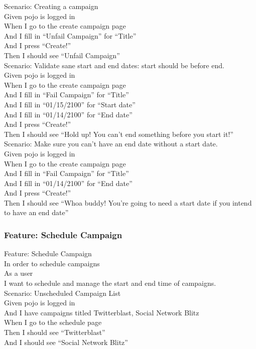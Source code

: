 \documentclass[12pt]{article}
\begin{document}
Scenario: Creating a campaign \\
  Given pojo is logged in \\
  When I go to the create campaign page \\
  And I fill in ``Unfail Campaign'' for ``Title'' \\
  And I press ``Create!'' \\
  Then I should see ``Unfail Campaign'' \\

Scenario: Validate sane start and end dates: start should be before end. \\
  Given pojo is logged in \\
  When I go to the create campaign page \\
  And I fill in ``Fail Campaign'' for ``Title'' \\
  And I fill in ``01/15/2100'' for ``Start date'' \\
  And I fill in ``01/14/2100'' for ``End date'' \\
  And I press ``Create!'' \\
  Then I should see ``Hold up! You can't end something before you start it!'' \\

Scenario: Make sure you can't have an end date without a start date. \\
  Given pojo is logged in \\
  When I go to the create campaign page \\
  And I fill in ``Fail Campaign'' for ``Title'' \\
  And I fill in ``01/14/2100'' for ``End date'' \\
  And I press ``Create!'' \\
  Then I should see ``Whoa buddy! You're going to need a start date if you intend to have an end date'' \\

\subsubsection{Feature: Schedule Campaign}

Feature: Schedule Campaign \\
  In order to schedule campaigns \\
  As a user \\
  I want to schedule and manage the start and end time of campaigns. \\

Scenario: Unscheduled Campaign List \\
  Given pojo is logged in \\
  And I have campaigns titled Twitterblast, Social Network Blitz \\
  When I go to the schedule page \\
  Then I should see ``Twitterblast'' \\
  And I should see ``Social Network Blitz'' \\
  
\end{document}
